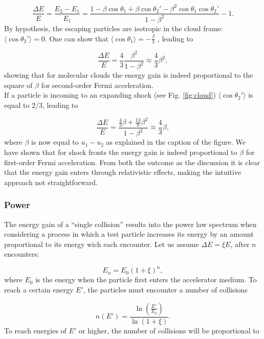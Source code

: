 \begin{equation}
\frac{\Delta E}{E} = \frac{E_2 -E_1}{E_1} = \frac{1 - 
\beta \cos \theta_1 + \beta \cos \theta_2' - \beta^2 \cos \theta_1 \cos \theta_2'}{1-\beta^2} -1.
\end{equation}
By hypothesis, the escaping particles are isotropic in the cloud frame: $\langle \cos \theta_2' \rangle = 0$. One can show that $\langle \cos \theta_1 \rangle = -\frac{\beta}{3}$ \cite{Gaisser:2016uoy}, leading to

\begin{equation}
\frac{\Delta E}{E} = \frac{4}{3} \frac{\beta^2}{1-\beta^2} \approx \frac{4}{3} \beta^2,
\end{equation}
showing that for molecular clouds the energy gain is indeed proportional to the square of $\beta$ for second-order Fermi acceleration.\\
\newline
If a particle is incoming to an expanding shock (see Fig. \ref{fig:cloud}) $\langle \cos \theta_2'\rangle$ is equal to 2/3, leading to

\begin{equation}
\frac{\Delta E}{E} = \frac{\frac{4}{3}\beta + \frac{13}{9}\beta^2}{1-\beta^2} \approx \frac{4}{3} \beta,
\end{equation}
where $\beta$ is now equal to $u_1 -u_2$ as explained in the caption of the figure. We have shown that for shock fronts the energy gain is indeed proportional to $\beta$ for first-order Fermi acceleration. From both the outcome as the discussion it is clear that the energy gain enters through relativistic effects, making the intuitive approach not straightforward.

\subsubsection{Power}
The energy gain of a ``single collision'' results into the power law spectrum when considering a process in which a test particle increases its energy by an amount proportional to its energy wich each encounter. Let us assume $\Delta E = \xi E$, after $n$ encounters:

\begin{equation}
E_n = E_0 \left(1+\xi\right)^n,
\end{equation}
where $E_0$ is the energy when the particle first enters the accelerator medium. To reach a certain energy $E'$, the particles must encounter a number of collisions

\begin{equation}
\label{eq:n}
n(E') = \frac{\ln \left(\frac{E'}{E_0}\right)}{\ln \left(1+\xi \right)}.
\end{equation}
To reach energies of $E'$ or higher, the number of collisions will be proportional to

